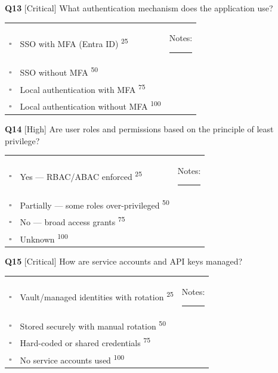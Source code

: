 \documentclass[11pt,landscape]{article}
\begin{document}
\noindent\colorbox{critbg}{\textbf{Q13} [Critical]} What authentication mechanism does the application use?

\begin{tabularx}{\textwidth}{cXX}
$\square$ & SSO with MFA (Entra ID) \textsuperscript{\scriptsize\textcolor{stridegray}{25}} & Notes: \rule{4cm}{0.4pt} \\
$\square$ & SSO without MFA \textsuperscript{\scriptsize\textcolor{stridegray}{50}} &  \\
$\square$ & Local authentication with MFA \textsuperscript{\scriptsize\textcolor{stridegray}{75}} &  \\
$\square$ & Local authentication without MFA \textsuperscript{\scriptsize\textcolor{stridegray}{100}} &  \\
\end{tabularx}

\vspace{0.3cm}

\noindent\colorbox{highbg}{\textbf{Q14} [High]} Are user roles and permissions based on the principle of least privilege?

\begin{tabularx}{\textwidth}{cXX}
$\square$ & Yes --- RBAC/ABAC enforced \textsuperscript{\scriptsize\textcolor{stridegray}{25}} & Notes: \rule{4cm}{0.4pt} \\
$\square$ & Partially --- some roles over-privileged \textsuperscript{\scriptsize\textcolor{stridegray}{50}} &  \\
$\square$ & No --- broad access grants \textsuperscript{\scriptsize\textcolor{stridegray}{75}} &  \\
$\square$ & Unknown \textsuperscript{\scriptsize\textcolor{stridegray}{100}} &  \\
\end{tabularx}

\vspace{0.3cm}

\noindent\colorbox{critbg}{\textbf{Q15} [Critical]} How are service accounts and API keys managed?

\begin{tabularx}{\textwidth}{cXX}
$\square$ & Vault/managed identities with rotation \textsuperscript{\scriptsize\textcolor{stridegray}{25}} & Notes: \rule{4cm}{0.4pt} \\
$\square$ & Stored securely with manual rotation \textsuperscript{\scriptsize\textcolor{stridegray}{50}} &  \\
$\square$ & Hard-coded or shared credentials \textsuperscript{\scriptsize\textcolor{stridegray}{75}} &  \\
$\square$ & No service accounts used \textsuperscript{\scriptsize\textcolor{stridegray}{100}} &  \\
\end{tabularx}
\end{document}
